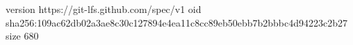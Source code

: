 version https://git-lfs.github.com/spec/v1
oid sha256:109ac62db02a3ae8c30c127894e4ea11c8cc89eb50ebb7b2bbbc4d94223c2b27
size 680
